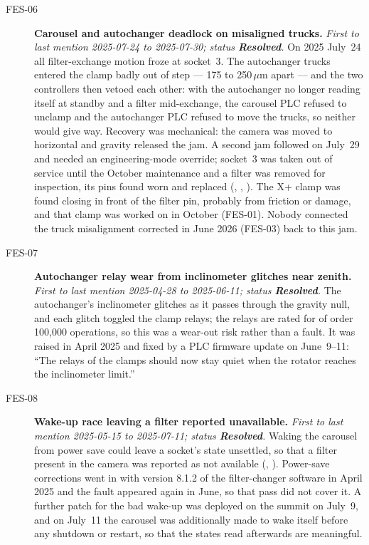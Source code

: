 \begin{description}
\item[FES-06]\label{iss:FES-06} \textbf{Carousel and autochanger deadlock on misaligned trucks.}
  \emph{First to last mention 2025-07-24 to 2025-07-30; status \textcolor{stres}{\textbf{Resolved}}.}
  On 2025 July~24 all filter-exchange motion froze at socket~3.  The autochanger trucks entered the clamp badly out of step --- 175 to 250\,$\mu$m apart --- and the two controllers then vetoed each other: with the autochanger no longer reading itself at standby and a filter mid-exchange, the carousel PLC refused to unclamp and the autochanger PLC refused to move the trucks, so neither would give way.  Recovery was mechanical: the camera was moved to horizontal and gravity released the jam.  A second jam followed on July~29 and needed an engineering-mode override; socket~3 was taken out of service until the October maintenance and a filter was removed for inspection, its pins found worn and replaced (, , ).  The X+ clamp was found closing in front of the filter pin, probably from friction or damage, and that clamp was worked on in October (FES-01).  Nobody connected the truck misalignment corrected in June 2026 (FES-03) back to this jam.

\item[FES-07]\label{iss:FES-07} \textbf{Autochanger relay wear from inclinometer glitches near zenith.}
  \emph{First to last mention 2025-04-28 to 2025-06-11; status \textcolor{stres}{\textbf{Resolved}}.}
  The autochanger's inclinometer glitches as it passes through the gravity null, and each glitch toggled the clamp relays; the relays are rated for of order 100{,}000 operations, so this was a wear-out risk rather than a fault.  It was raised in April 2025 and fixed by a PLC firmware update on June~9--11: ``The relays of the clamps should now stay quiet when the rotator reaches the inclinometer limit.''

\item[FES-08]\label{iss:FES-08} \textbf{Wake-up race leaving a filter reported unavailable.}
  \emph{First to last mention 2025-05-15 to 2025-07-11; status \textcolor{stres}{\textbf{Resolved}}.}
  Waking the carousel from power save could leave a socket's state unsettled, so that a filter present in the camera was reported as not available (, ).  Power-save corrections went in with version 8.1.2 of the filter-changer software in April 2025 and the fault appeared again in June, so that pass did not cover it.  A further patch for the bad wake-up was deployed on the summit on July~9, and on July~11 the carousel was additionally made to wake itself before any shutdown or restart, so that the states read afterwards are meaningful.


\end{description}
